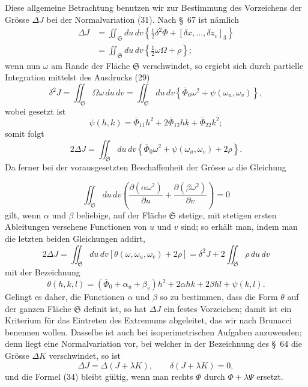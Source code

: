 \documentclass[11pt,a4paper,leqno]{article}
\begin{document}
Diese allgemeine Betrachtung benutzen wir zur Bestimmung des Vorzeichens der
Grösse $\Delta J$ bei der Normalvariation (31). Nach \S~67 ist nämlich
\[
\begin{aligned}
\Delta J
&=\iint_{\mathfrak{S}}du\,dv
\left\{\tfrac12\delta^2\Phi+[\delta x,\ldots,\delta z_v]_3\right\}\\
&=\iint_{\mathfrak{S}}du\,dv\left\{\tfrac12\omega\Omega+\rho\right\};
\end{aligned}
\]
wenn nun $\omega$ am Rande der Fläche $\mathfrak{S}$ verschwindet, so ergiebt
sich durch partielle Integration mittelst des Ausdrucks (29)
\begin{equation}\tag{33}
\delta^2J=\iint_{\mathfrak{S}}\Omega\omega\,du\,dv
=\iint_{\mathfrak{S}}du\,dv
\left\{\bar\Phi_0\omega^2+\psi(\omega_u,\omega_v)\right\},
\end{equation}
wobei gesetzt ist
\[
\psi(h,k)=\bar\Phi_{11}h^2+2\bar\Phi_{12}hk+\bar\Phi_{22}k^2;
\]
somit folgt
\[
2\Delta J=\iint_{\mathfrak{S}}du\,dv
\left\{\bar\Phi_0\omega^2+\psi(\omega_u,\omega_v)+2\rho\right\}.
\]
Da ferner bei der vorausgesetzten Beschaffenheit der Grösse $\omega$ die
Gleichung

\[
\iint_{\mathfrak{S}}du\,dv
\left(\frac{\partial(\alpha\omega^2)}{\partial u}
+\frac{\partial(\beta\omega^2)}{\partial v}\right)=0
\]
gilt, wenn $\alpha$ und $\beta$ beliebige, auf der Fläche $\mathfrak{S}$
stetige, mit stetigen ersten Ableitungen versehene Functionen von $u$ und
$v$ sind; so erhält man, indem man die letzten beiden Gleichungen addirt,
\begin{equation}\tag{34}
2\Delta J=\iint_{\mathfrak{S}}du\,dv
[\theta(\omega,\omega_u,\omega_v)+2\rho]
=\delta^2J+2\iint_{\mathfrak{S}}\rho\,du\,dv
\end{equation}
mit der Bezeichnung
\[
\theta(h,k,l)=(\bar\Phi_0+\alpha_u+\beta_v)h^2
+2\alpha hk+2\beta hl+\psi(k,l).
\]
Gelingt es daher, die Functionen $\alpha$ und $\beta$ so zu bestimmen, dass
die Form $\theta$ auf der ganzen Fläche $\mathfrak{S}$ definit ist, so hat
$\Delta J$ ein festes Vorzeichen; damit ist ein Kriterium für das Eintreten
des Extremums abgeleitet, das wir nach Brunacci benennen wollen. Dasselbe ist
auch bei isoperimetrischen Aufgaben anzuwenden; denn liegt eine
Normalvariation vor, bei welcher in der Bezeichnung des \S~64 die Grösse
$\Delta K$ verschwindet, so ist
\[
\Delta J=\Delta(J+\lambda K),\qquad \delta(J+\lambda K)=0,
\]
und die Formel (34) bleibt gültig, wenn man rechts $\Phi$ durch
$\Phi+\lambda\Psi$ ersetzt.
\end{document}
